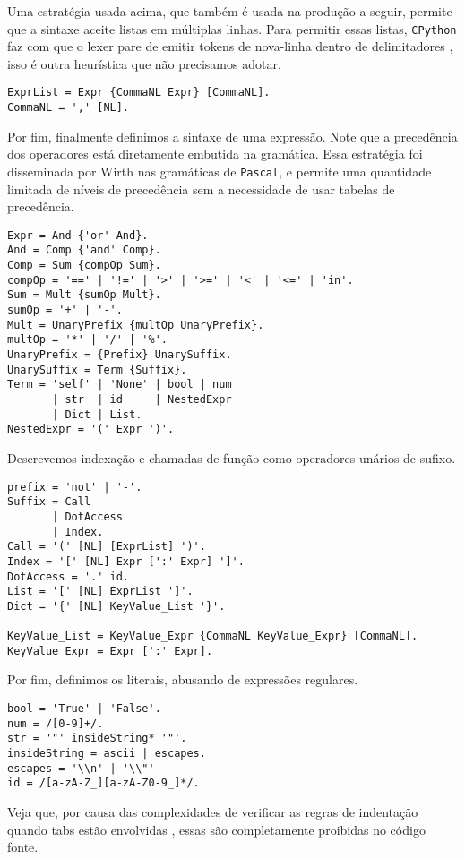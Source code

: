 Uma estratégia usada acima, que também é usada na
produção a seguir, permite que a sintaxe aceite
listas em múltiplas linhas.
Para permitir essas listas,
\texttt{CPython} faz com que o lexer pare de emitir tokens
de nova-linha dentro de delimitadores
\cite{implicit_line_joining}, isso é outra heurística
que não precisamos adotar.

\begin{lstlisting}
ExprList = Expr {CommaNL Expr} [CommaNL].
CommaNL = ',' [NL].
\end{lstlisting}

Por fim, finalmente definimos a sintaxe de uma expressão.
Note que a precedência dos operadores está diretamente
embutida na gramática. Essa estratégia foi disseminada
por Wirth nas gramáticas de \texttt{Pascal}, e permite uma
quantidade limitada de níveis de precedência sem a necessidade
de usar tabelas de precedência.

\begin{lstlisting}
Expr = And {'or' And}.
And = Comp {'and' Comp}.
Comp = Sum {compOp Sum}.
compOp = '==' | '!=' | '>' | '>=' | '<' | '<=' | 'in'.
Sum = Mult {sumOp Mult}.
sumOp = '+' | '-'.
Mult = UnaryPrefix {multOp UnaryPrefix}.
multOp = '*' | '/' | '%'.
UnaryPrefix = {Prefix} UnarySuffix.
UnarySuffix = Term {Suffix}.
Term = 'self' | 'None' | bool | num
       | str  | id     | NestedExpr
       | Dict | List.
NestedExpr = '(' Expr ')'.
\end{lstlisting}

Descrevemos indexação e chamadas de função
como operadores unários de sufixo. 

\begin{lstlisting}
prefix = 'not' | '-'.
Suffix = Call
       | DotAccess
       | Index.
Call = '(' [NL] [ExprList] ')'.
Index = '[' [NL] Expr [':' Expr] ']'.
DotAccess = '.' id.
List = '[' [NL] ExprList ']'.
Dict = '{' [NL] KeyValue_List '}'.

KeyValue_List = KeyValue_Expr {CommaNL KeyValue_Expr} [CommaNL].
KeyValue_Expr = Expr [':' Expr].
\end{lstlisting}

Por fim, definimos os literais, abusando de expressões
regulares.

\begin{lstlisting}
bool = 'True' | 'False'.
num = /[0-9]+/.
str = '"' insideString* '"'.
insideString = ascii | escapes.
escapes = '\\n' | '\\"'
id = /[a-zA-Z_][a-zA-Z0-9_]*/.
\end{lstlisting}

Veja que, por causa das complexidades de verificar as regras de
indentação quando tabs estão envolvidas \cite{tab_error},
essas são completamente proibidas no código fonte.
